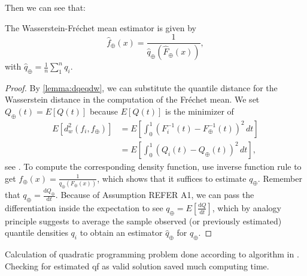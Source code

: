 Then we can see that:
\begin{lemma}
    The Wasserstein-Fréchet mean estimator is given by
    \begin{equation}
        \hat{f}_\oplus(x) = \frac{1}{\hat{q}_\oplus(\hat{F}_\oplus(x))},
    \end{equation}
    with $\hat{q}_\oplus = \frac{1}{n} \sum_{1}^{n} q_i$.
\end{lemma}
\begin{proof}
    By \ref{lemma:dqeqdw}, we can substitute the quantile distance for the
    Wasserstein distance in the computation of the Fréchet mean. We set
    $Q_\oplus(t) = E[Q(t)]$ because $E[Q(t)]$ is the minimizer of
    \begin{equation}
    \label{eq:wf_mean}
        \begin{aligned}
            E[d_w^2(f_i, f_\oplus)]	& =
            E\left[\int_{0}^{1}(F_i^{-1}(t) - F_\oplus^{-1}(t))^2 \,dt\right] \\
                                    & =
            E\left[\int_{0}^{1}(Q_i(t) - Q_\oplus(t))^2 \,dt\right],
        \end{aligned}
    \end{equation}
    see \citet[Chapter~3.1.4]{PanaretosZemel2020}. To compute the corresponding density
    function, use inverse function rule to get
    $f_\oplus(x) = \frac{1}{q_\oplus(F_\oplus(x))}$, which shows that it suffices to
    estimate $q_\oplus$. Remember that
    $q_\oplus = \frac{\mathrm{d}Q_\oplus}{\mathrm{d}t}$. Because of Assumption REFER A1,
    we can pass the differentiation inside the expectation to see
    $q_\oplus = E\left[\frac{\mathrm{d}Q}{\mathrm{d}t}\right]$, which by analogy
    principle suggests to average the sample observed (or previously estimated)
    quantile densities $q_i$ to obtain an estimator $\hat{q}_\oplus$ for $q_\oplus$.
\end{proof}


Calculation of quadratic programming problem done according to algorithm in \textcite{PetersenLiuDivani2021}.
Checking for estimated qf as valid solution saved much computing time.